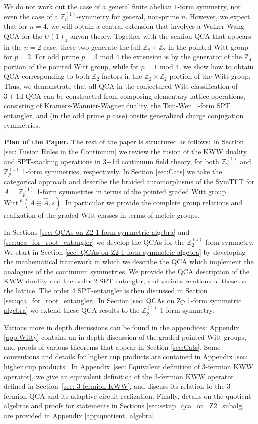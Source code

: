 \documentclass[aps,twocolumn,prx,floatfix,preprintnumbers, nofootinbib,10pt]{revtex4-2}
\numberwithin{equation}{section}
\theoremstyle{definition}
\theoremstyle{remark}
\theoremstyle{claim}
\newcommand{\Z}{{\mathbb Z}}
\newcommand{\Witt}{\text{Witt}}
\newcommand{\pt}{\text{pt}}
\begin{document}
We do not work out the case of a general finite abelian $1$-form symmetry, nor even the case of a $\Z_n^{(1)}$-symmetry for general, non-prime $n$.  However, we expect that for $n=4$, we will obtain a central extension that involves a Walker-Wang QCA for the $U(1)_4$ anyon theory.  Together with the semion QCA that appears in the $n=2$ case, these two generate the full $\Z_8 \times \Z_2$ in the pointed Witt group for $p=2$.  For odd prime $p = 3$ mod $4$ the extension is by the generator of the $\Z_4$ portion of the pointed Witt group, while for $p = 1$ mod $4$, we show how to obtain QCA corresponding to both $\Z_2$ factors in the $\Z_2 \times \Z_2$ portion of the Witt group.  Thus, we demonstrate that all QCA in the conjectured Witt classification of $3+1$d QCA can be constructed from composing elementary lattice operations, consisting of Kramers-Wannier-Wagner duality, the Tsui-Wen $1$-form SPT entangler, and (in the odd prime $p$ case) onsite generalized charge conjugation symmetries.  

\noindent
{\bf Plan of the Paper.} The rest of the paper is structured as follows:
In Section \ref{sec: Fusion Rules in the Continuum} we review the 
fusion of the KWW duality and SPT-stacking operations in 3+1d continuum field theory, for both $\Z_2^{(1)}$ and $\Z_p^{(1)}$ 1-form symmetries, respectively.  
In Section \ref{sec:Cats} we take the categorical approach and describe the braided automorphisms of the SymTFT for $A=\Z_p^{(1)}$ 1-form symmetries in terms of the pointed graded Witt group $\Witt^\pt(A \oplus \widehat{A}, s)$. In particular we provide the complete group relations and realization of the graded Witt classes in terms of metric groups. 

In Sections \ref{sec: QCAs on Z2 1-form symmetric algebra} and 
\ref{sec:qca_for_root_entangler} we develop the QCAs for the $\Z_2^{(1)}$-form symmetry. We start in Section \ref{sec: QCAs on Z2 1-form symmetric algebra}
 by developing the mathematical framework in which we describe the QCA which implement the analogues of the continuum symmetries. 
We provide the QCA description of the KWW duality and the order 2 SPT entangler, and various relations of these on the lattice. 
The order 4 SPT-entangler is then discussed in Section \ref{sec:qca_for_root_entangler}. 
In Section \ref{sec: QCAs on Zp 1-form symmetric algebra} we extend these QCA results to the $\Z_p^{(1)}$ 1-form symmetry. 

Various more in depth discussions can be found in the appendices: 
Appendix \ref{app:Witty} contains an in depth discussion of the graded pointed Witt groups, and proofs of various theorems that appear in Section \ref{sec:Cats}. Some conventions and details for higher cup products are contained in Appendix \ref{sec: higher cup products}. In Appendix~\ref{sec: Equivalent definition of 3-fermion KWW operator}, we give an equivalent definition of the 3-fermion KWW operator defined in Section~\ref{sec: 3-fermion KWW}, and discuss its relation to the 3-fermion QCA and its adaptive circuit realization. 
Finally, details on the quotient algebras and proofs for statements in Sections \ref{sec:setup_qca_on_Z2_subalg} are provided in Appendix \ref{app:quotient_algebra}. 
\end{document}
